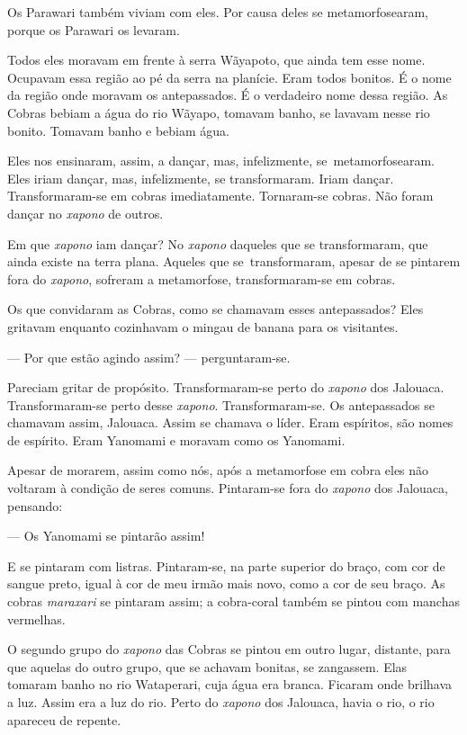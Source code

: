 Os Parawari também viviam com eles. Por causa deles se metamorfosearam,
porque os Parawari os levaram. 

Todos eles moravam em frente à serra Wãyapoto, que ainda tem esse nome.
Ocupavam essa região ao pé da serra na planície. Eram todos bonitos. É o
nome da região onde moravam os antepassados. É o verdadeiro nome dessa
região. As Cobras bebiam a água do rio Wãyapo, tomavam banho, se lavavam
nesse rio bonito. Tomavam banho e bebiam água. 

Eles nos ensinaram, assim, a dançar, mas, infelizmente, se~metamorfosearam. Eles iriam dançar, mas, infelizmente, se transformaram.
 Iriam dançar. Transformaram-se em cobras imediatamente. Tornaram-se
 cobras. Não foram dançar no \textit{xapono} de outros.

Em que \textit{xapono} iam dançar? No \textit{xapono} daqueles que se transformaram, que ainda existe na terra plana. Aqueles que se~transformaram, apesar de se
pintarem fora do \textit{xapono}, sofreram a metamorfose, transformaram-se em
cobras.

Os que convidaram as Cobras, como se chamavam esses antepassados? Eles
gritavam enquanto cozinhavam o mingau de banana para os visitantes. 

--- Por que estão agindo assim? --- perguntaram-se.

Pareciam gritar de propósito. Transformaram-se perto do \textit{xapono} dos
Jalouaca. Transformaram-se perto desse \textit{xapono}. Transformaram-se. Os
antepassados se chamavam assim, Jalouaca. Assim se chamava o líder. Eram
espíritos, são nomes de espírito. Eram Yanomami e moravam como os
Yanomami. 

Apesar de morarem, 
assim como nós, após a metamorfose em cobra eles não
voltaram à condição de seres comuns. Pintaram-se fora do \textit{xapono} dos
Jalouaca, pensando: 

--- Os Yanomami se pintarão assim! 

E se pintaram com listras. Pintaram-se, na parte superior do braço, com
cor de sangue preto, igual à cor de meu irmão mais novo, como a cor de
seu braço. As cobras \textit{maraxari} se pintaram assim; a cobra-coral
também se pintou com manchas vermelhas. 

O segundo grupo do \textit{xapono} das Cobras se pintou em outro lugar, distante,
 para que aquelas do outro grupo, que se achavam bonitas, se zangassem.
 Elas tomaram banho no rio Wataperari, cuja água era branca. Ficaram onde
 brilhava a luz. Assim era a luz do rio. Perto do \textit{xapono} dos Jalouaca,
 havia o rio, o rio apareceu de repente.

